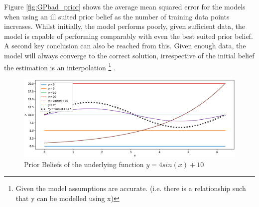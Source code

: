 Figure \ref{fig:GPbad_prior} shows the average mean squared error for the models when using an ill suited prior belief as the number of training data points increases. Whilst initially, the model performs poorly, given sufficient data, the model is capable of performing comparably with even the best suited prior belief.
 A second key conclusion can also be reached from this. Given enough data, the model will always converge to the correct solution, irrespective of the initial belief the estimation is an interpolation \footnote{Given the model assumptions are accurate. (i.e. there is a relationship such that y can be modelled using x)} \cite{Micchelli:2006:UK:1248547.1248642}.


\begin{figure}[h!]
    \centering
    \includegraphics[width=\textwidth]{images/Prior_Beliefs_edit.eps}
    \caption{Prior Beliefs of the underlying function $y=4sin(x)+10$}
    \label{fig:GPprior_beliefs}
\end{figure}


